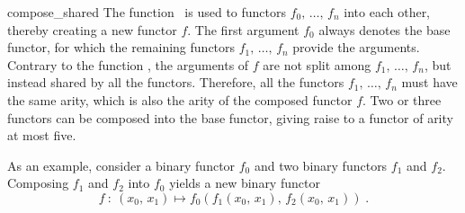 \begin{ccRefFunction}{compose_shared}
  \ccDefinition The function \ccRefName\ is used to
   functors $f_0,\,\ldots,\,f_n$ into each
  other, thereby creating a new functor $f$. The first argument $f_0$
  always denotes the base functor, for which the remaining functors
  $f_1,\,\ldots,\,f_n$ provide the arguments. Contrary to the function
  , the arguments of $f$ are not split among
  $f_1,\,\ldots,\,f_n$, but instead shared by all the
  functors. Therefore, all the functors $f_1,\,\ldots,\,f_n$ must have
  the same arity, which is also the arity of the composed functor
  $f$. Two or three functors can be composed into the base functor,
  giving raise to a functor of arity at most five.
  
  As an example, consider a binary functor $f_0$ and two binary
  functors $f_1$ and $f_2$. Composing $f_1$ and $f_2$ into $f_0$
  yields a new binary functor
  $$
  f\::\: (x_0,\,x_1) \mapsto
  f_0\left(f_1(x_0,\,x_1),\,f_2(x_0,\,x_1)\right)\;.
  $$
  
  
  
  
  \ccSeeAlso
  \\
  \\
  
\end{ccRefFunction}

